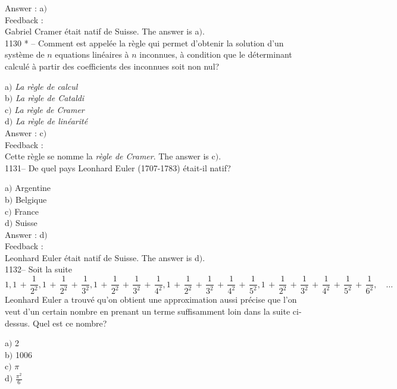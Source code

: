 ﻿\documentclass[letterpaper, 12pt]{article}
\begin{document}
Answer : a$)$\\

Feedback : \\
Gabriel Cramer \'etait natif de Suisse.
The answer is a$)$.\\

1130 * -- Comment est appel\'ee la r\`egle qui permet d'obtenir la
solution d'un syst\`eme de $n$ equations lin\'eaires \`a $n$
inconnues, \`a condition que le d\'eterminant calcul\'e \`a partir
des coefficients des inconnues soit non nul?

a$)$ {\sl La r\`egle de calcul} \\
b$)$ {\sl La r\`egle de Cataldi} \\
c$)$ {\sl La r\`egle de Cramer} \\
d$)$ {\sl La r\`egle de lin\'earit\'e}   \\

Answer : c$)$\\

Feedback : \\
Cette r\`egle se nomme la {\sl r\`egle de Cramer}.
The answer is c$)$.\\

1131-- De quel pays Leonhard Euler (1707-1783) \'etait-il natif?

a$)$ Argentine\\
b$)$ Belgique \\
c$)$ France  \\
d$)$ Suisse  \\


Answer : d$)$\\

Feedback : \\
Leonhard Euler \'etait natif de Suisse. The answer is d$)$. \\

1132-- Soit la suite
$$\displaystyle{1,1\,+\,\frac1{2^2},1\,+\,\frac1{2^2}\,+\,\frac1{3^2},1\,+\,\frac1{2^2}\,+\,\frac1{3^2}\,+\,\frac1{4^2},
1\,+\,\frac1{2^2}\,+\,\frac1{3^2}\,+\,\frac1{4^2}\,+\,\frac1{5^2},
1\,+\,\frac1{2^2}\,+\,\frac1{3^2}\,+\,\frac1{4^2}\,+\,\frac1{5^2}\,+\,\frac1{6^2}},\quad\ldots$$
Leonhard Euler a trouv\'e qu'on obtient une approximation aussi
pr\'ecise que l'on veut d'un certain nombre en prenant un terme
suffisamment loin dans la suite ci-dessus. Quel est ce nombre?

a$)$ 2\\
b$)$ 1006 \\
c$)$ $\pi$ \\
d$)$ $\frac{\pi^2}6$\\
\end{document}
